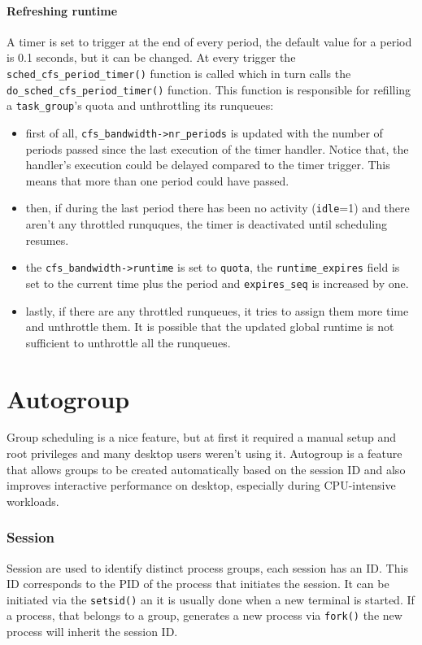 \paragraph{Refreshing runtime}
A timer is set to trigger at the end of every period, the default value for a period is 0.1 seconds, but it can be changed. At every trigger the \verb|sched_cfs_period_timer()| function is called which in turn calls the \verb|do_sched_cfs_period_timer()| function. This function is responsible for refilling a \verb|task_group|'s quota and unthrottling its runqueues:
\begin{itemize}
    \item first of all, \verb|cfs_bandwidth->nr_periods| is updated with the number of periods passed since the last execution of the timer handler. Notice that, the handler's execution could be delayed compared to the timer trigger. This means that more than one period could have passed.
    \item then, if during the last period there has been no activity (\verb|idle|=1) and there aren't any throttled runquques, the timer is deactivated until scheduling resumes. %
    \item the \verb|cfs_bandwidth->runtime| is set to \verb|quota|, the \verb|runtime_expires| field is set to the current time plus the period and \verb|expires_seq| is increased by one.
    \item lastly, if there are any throttled runqueues, it tries to assign them more time and unthrottle them. It is possible that the updated global runtime is not sufficient to unthrottle all the runqueues.
\end{itemize}

\section{Autogroup}%
Group scheduling is a nice feature, but at first it required a manual setup and root privileges and many desktop users weren't using it. Autogroup is a feature that allows groups to be created automatically based on the session ID and also improves interactive performance on desktop, especially during CPU-intensive workloads.

\subsubsection{Session}
Session are used to identify distinct process groups, each session has an ID. This ID corresponds to the PID of the process that initiates the session. It can be initiated via the \verb|setsid()| an it is usually done when a new terminal is started. If a process, that belongs to a group, generates a new process via \verb|fork()| the new process will inherit the session ID.

